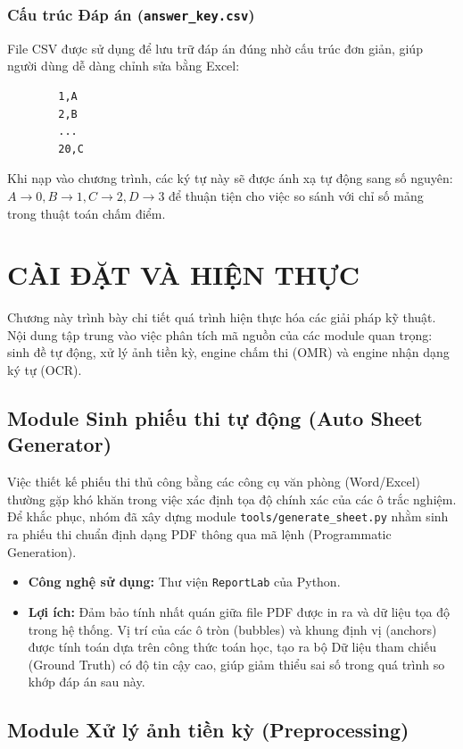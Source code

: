 \documentclass[6pt, a4paper]{report}
\begin{document}
	\subsection{Cấu trúc Đáp án (\texttt{answer\_key.csv})}
	File CSV được sử dụng để lưu trữ đáp án đúng nhờ cấu trúc đơn giản, giúp người dùng dễ dàng chỉnh sửa bằng Excel:
	\begin{verbatim}
		1,A
		2,B
		...
		20,C
	\end{verbatim}
	Khi nạp vào chương trình, các ký tự này sẽ được ánh xạ tự động sang số nguyên: $A \rightarrow 0, B \rightarrow 1, C \rightarrow 2, D \rightarrow 3$ để thuận tiện cho việc so sánh với chỉ số mảng trong thuật toán chấm điểm.
	
	
	\chapter{CÀI ĐẶT VÀ HIỆN THỰC}
	
	Chương này trình bày chi tiết quá trình hiện thực hóa các giải pháp kỹ thuật. Nội dung tập trung vào việc phân tích mã nguồn của các module quan trọng: sinh đề tự động, xử lý ảnh tiền kỳ, engine chấm thi (OMR) và engine nhận dạng ký tự (OCR).
	
	\section{Module Sinh phiếu thi tự động (Auto Sheet Generator)}
	
	Việc thiết kế phiếu thi thủ công bằng các công cụ văn phòng (Word/Excel) thường gặp khó khăn trong việc xác định tọa độ chính xác của các ô trắc nghiệm. Để khắc phục, nhóm đã xây dựng module \texttt{tools/generate\_sheet.py} nhằm sinh ra phiếu thi chuẩn định dạng PDF thông qua mã lệnh (Programmatic Generation).
	
	\begin{itemize}
		\item \textbf{Công nghệ sử dụng:} Thư viện \texttt{ReportLab} của Python.
		\item \textbf{Lợi ích:} Đảm bảo tính nhất quán giữa file PDF được in ra và dữ liệu tọa độ trong hệ thống. Vị trí của các ô tròn (bubbles) và khung định vị (anchors) được tính toán dựa trên công thức toán học, tạo ra bộ Dữ liệu tham chiếu (Ground Truth) có độ tin cậy cao, giúp giảm thiểu sai số trong quá trình so khớp đáp án sau này.
	\end{itemize}
	
	\section{Module Xử lý ảnh tiền kỳ (Preprocessing)}
	
\end{document}
